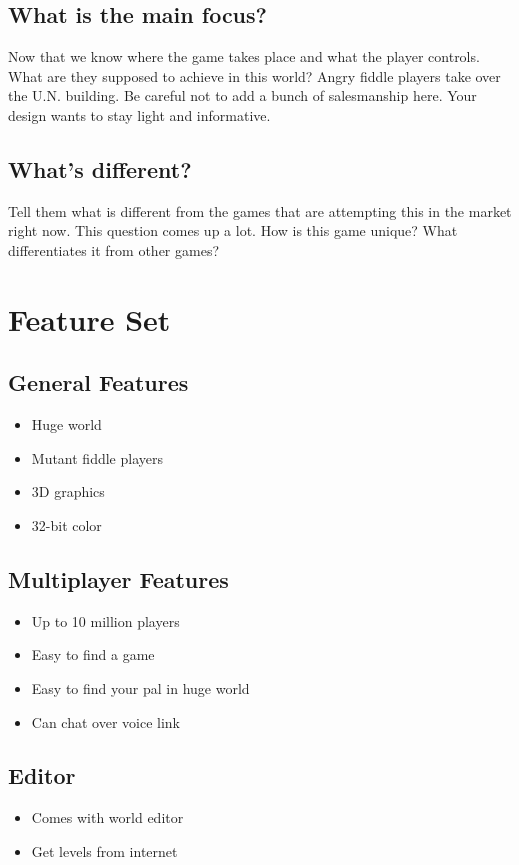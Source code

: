 \documentclass[11pt]{article}
\begin{document}
    \subsection{What is the main focus?}
      Now that we know where the game takes place and what the player controls. What are they supposed to achieve in this world? Angry fiddle players take over the U.N. building. Be careful not to add a bunch of salesmanship here. Your design wants to stay light and informative.

    \subsection{What’s different?}
      Tell them what is different from the games that are attempting this in the market right now. This question comes up a lot. How is this game unique? What differentiates it from other games?

  \section{Feature Set}
    \subsection{General Features}
      \begin{itemize}
        \item Huge world
        \item Mutant fiddle players
        \item 3D graphics
        \item 32-bit color
      \end{itemize}

    \subsection{Multiplayer Features}
      \begin{itemize}
        \item Up to 10 million players
        \item Easy to find a game
        \item Easy to find your pal in huge world
        \item Can chat over voice link
      \end{itemize}

    \subsection{Editor}
      \begin{itemize}
          \item Comes with world editor
          \item Get levels from internet
      \end{itemize}
\end{document}
